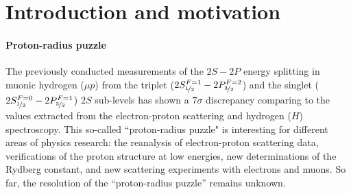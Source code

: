 \documentclass[12pt]{article}
\begin{document}
\section{Introduction and motivation}
\paragraph{Proton-radius puzzle}
The previously conducted measurements \cite{spectroscopy} of the $2S - 2P$ energy splitting in muonic hydrogen ($\mu{p}$) from the triplet ($2S_{\nicefrac{1}{2}}^{F=1} - 2P_{\nicefrac{3}{2}}^{F=2}$) and the singlet ($2S_{\nicefrac{1}{2}}^{F=0} - 2P_{\nicefrac{3}{2}}^{F=1}$) $2S$ sub-levels has shown a $7{\sigma}$ discrepancy comparing to the values extracted from the electron-proton scattering and hydrogen ($H$) spectroscopy. This so-called ``proton-radius puzzle" is interesting for different areas of physics research: the reanalysis of electron-proton scattering data, verifications of the proton structure at low energies, new determinations of the Rydberg constant, and new scattering experiments with electrons and muons. So far, the resolution of the ``proton-radius puzzle'' remains unknown.
\end{document}
